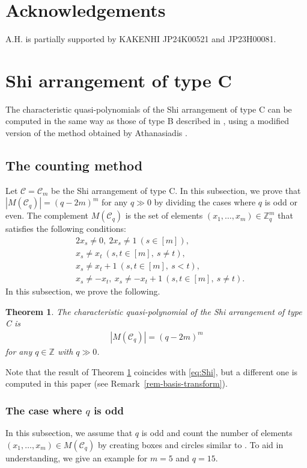 \documentclass{article}
\theoremstyle{plain}
\newtheorem{Them}{Theorem}[section]
\theoremstyle{definition}
\theoremstyle{remark}
\numberwithin{equation}{section}
\newcommand{\Cc}{\mathcal{C}}
\begin{document}
\section*{Acknowledgements}
A.H. is partially supported by KAKENHI JP24K00521 and JP23H00081.


\section{Shi arrangement of type C}\label{sec-TypeC}
The characteristic quasi-polynomials of the Shi arrangement of type C can be computed in the same way as those of type B described in \cite{HN2024}, using a modified version of the method obtained by Athanasiadis \cite{Athanasiadis1996}.

\subsection{The counting method}\label{sec-TypeC-counting}
Let $\Cc=\mathcal{C}_m$ be the Shi arrangement of type C.
In this subsection, we prove that $|M(\Cc_q)|=(q-2m)^m$ for any $q\gg 0$ by dividing the cases where $q$ is odd or even.
The complement $M(\Cc_q)$ is the set of elements $(x_1,\dots,x_m)\in\mathbb{Z}_q^m$ that satisfies the following conditions:
\begin{align*}
&2x_s\neq 0,\ 2x_s\neq 1\ (s\in [m]),\\
&x_s\neq x_t\ (s,t\in [m],\ s\neq t),\\
&x_s\neq x_t+1\ (s,t\in [m],\ s<t),\\
&x_s\neq -x_t,\ x_s\neq -x_t+1\ (s,t\in [m],\ s\neq t).
\end{align*}
In this subsection, we prove the following.
\begin{Them}\label{thm-chara-quasi-TypeC}
The characteristic quasi-polynomial of the Shi arrangement of type C is 
\begin{align*}
\left|M(\Cc_q)\right|=(q-2m)^m
\end{align*}
for any $q\in\mathbb{Z}$ with $q\gg 0$.
\end{Them}
Note that the result of Theorem \ref{thm-chara-quasi-TypeC} coincides with \eqref{eq:Shi}, but a different one is computed in this paper (see Remark~\ref{rem-basis-transform}).

\subsubsection{The case where $q$ is odd}\label{sec-TypeC-odd}
In this subsection, we assume that $q$ is odd and count the number of elements $(x_1,\dots,x_m)\in M(\Cc_q)$ by creating boxes and circles similar to \cite[Section 2..4.1]{HN2024}.
To aid in understanding, we give an example for $m=5$ and $q=15$.
\end{document}
